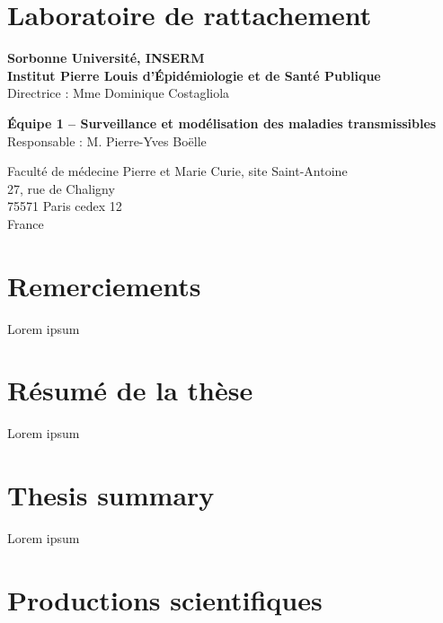 
\clearpage
\clearpage
\section*{Laboratoire de rattachement}
\vspace{2em}

\begin{center}
{\bf Sorbonne Université, INSERM \\ 
Institut Pierre Louis d’Épidémiologie et de Santé Publique} \\
Directrice : Mme Dominique Costagliola

\vspace{2em}
{\bf Équipe 1 -- Surveillance et modélisation des maladies transmissibles} \\
Responsable : M. Pierre-Yves Boëlle

\vspace{2em}
Faculté de médecine Pierre et Marie Curie, site Saint-Antoine \\
27, rue de Chaligny \\
75571 Paris cedex 12 \\
France
\end{center}

\clearpage
\section*{Remerciements}
\vspace{2em}

Lorem ipsum

\clearpage
\section*{Résumé de la thèse}
\vspace{2em}

Lorem ipsum

\clearpage
\section*{Thesis summary}
\vspace{2em}

Lorem ipsum

\clearpage
\section*{Productions scientifiques}
\vspace{2em}


